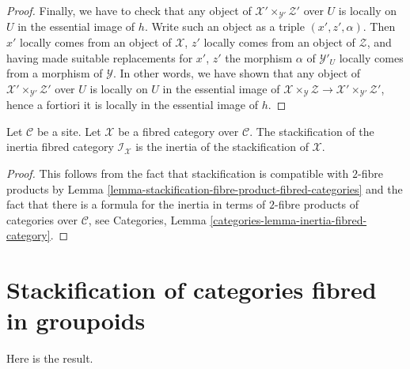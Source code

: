 \begin{proof}
\medskip\noindent
Finally, we have to check that any object of
$\mathcal{X}' \times_{\mathcal{Y}'} \mathcal{Z}'$
over $U$ is locally on $U$ in the essential image of $h$.
Write such an object as a triple $(x', z', \alpha)$.
Then $x'$ locally comes from an object of $\mathcal{X}$,
$z'$ locally comes from an object of $\mathcal{Z}$, and
having made suitable replacements for $x'$, $z'$ the morphism
$\alpha$ of $\mathcal{Y}'_U$ locally comes from a morphism of
$\mathcal{Y}$. In other words, we have shown that any object of
$\mathcal{X}' \times_{\mathcal{Y}'} \mathcal{Z}'$
over $U$ is locally on $U$ in the essential image of
$\mathcal{X} \times_\mathcal{Y} \mathcal{Z} \to
\mathcal{X}' \times_{\mathcal{Y}'} \mathcal{Z}'$, hence
a fortiori it is locally in the essential image of $h$.
\end{proof}

\begin{lemma}
\label{lemma-stackification-inertia}
Let $\mathcal{C}$ be a site.
Let $\mathcal{X}$ be a fibred category over $\mathcal{C}$.
The stackification of the inertia fibred category $\mathcal{I}_\mathcal{X}$
is the inertia of the stackification of $\mathcal{X}$.
\end{lemma}

\begin{proof}
This follows from the fact that stackification is compatible
with $2$-fibre products by
Lemma \ref{lemma-stackification-fibre-product-fibred-categories}
and the fact that there is a formula for the inertia in terms of
$2$-fibre products of categories over $\mathcal{C}$, see
Categories, Lemma \ref{categories-lemma-inertia-fibred-category}.
\end{proof}





\section{Stackification of categories fibred in groupoids}
\label{section-stackify-groupoids}

\noindent
Here is the result.

